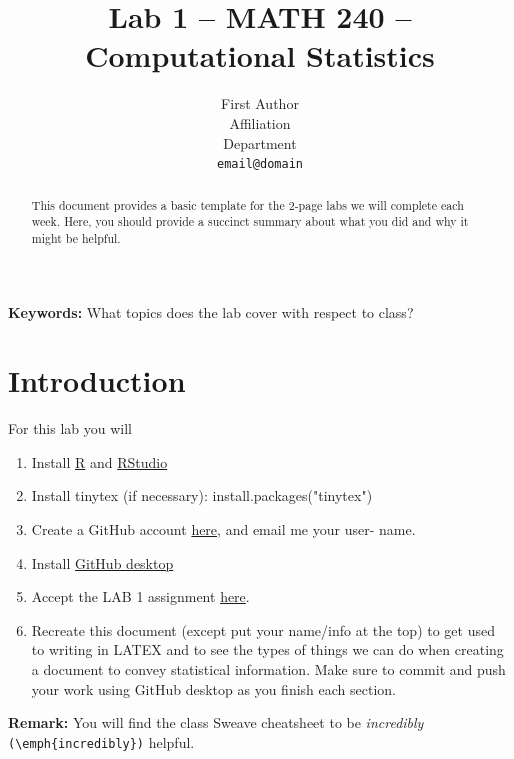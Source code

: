 \documentclass{article}\usepackage[]{graphicx}\usepackage[]{xcolor}
\begin{document}
\vspace{-1in}
\title{Lab 1 -- MATH 240 -- Computational Statistics}

\author{
  First Author \\
  Affiliation  \\
  Department  \\
  {\tt email@domain}
}

\date{}

\maketitle

\begin{multicols}{2}
\begin{abstract}
This document provides a basic template for the 2-page labs we will complete each week. Here, you should provide a succinct summary about what you did and why it might be helpful.
\end{abstract}

\textbf{Keywords:} What topics does the lab cover with respect to class?

\section{Introduction}
For this lab you will
\\
\begin{enumerate}[1.]\itemsep0em
\item Install \href{https://cran.rstudio.com/} R and \href{https://posit.co/download/rstudio-desktop/} {RStudio}
\item Install tinytex (if necessary):
      install.packages("tinytex")
\item Create a GitHub account \href{https://github.com/} {here}, and email me your user- name.
\item Install \href{https://github.com/apps/desktop} {GitHub desktop}
\item Accept the LAB 1 assignment \href{https://classroom.github.com/assignment-invitations/49ec7c38806e92bfef8bf3094b9b11d3} {here}.
\item Recreate this document (except put your name/info at the top) to get used to writing in LATEX and to see the types of things we can do when creating a document to convey statistical information. Make sure to commit and push your work using GitHub desktop as you finish each section.
\end{enumerate}
\textbf{Remark:} You will find the class Sweave cheatsheet to be \textit{incredibly} \verb|(\emph{incredibly})| helpful.


\end{multicols}
\end{document}
